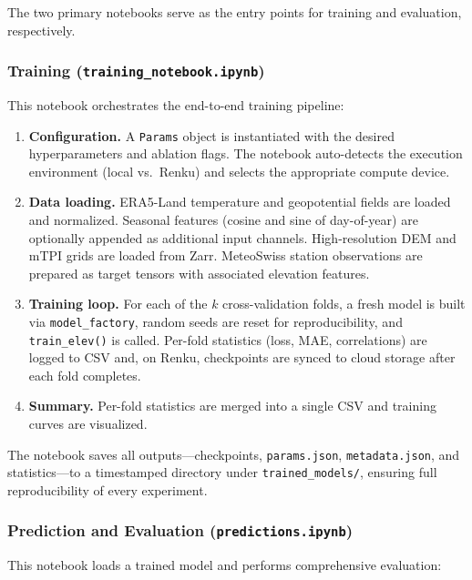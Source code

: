 The two primary notebooks serve as the entry points for training and evaluation, respectively.

\subsubsection{Training (\texttt{training\_notebook.ipynb})}

This notebook orchestrates the end-to-end training pipeline:

\begin{enumerate}
  \item \textbf{Configuration.} A \texttt{Params} object is instantiated with the desired hyperparameters and ablation flags.
  The notebook auto-detects the execution environment (local vs.\ Renku) and selects the appropriate compute device.

  \item \textbf{Data loading.} ERA5-Land temperature and geopotential fields are loaded and normalized.
  Seasonal features (cosine and sine of day-of-year) are optionally appended as additional input channels.
  High-resolution DEM and mTPI grids are loaded from Zarr.
  MeteoSwiss station observations are prepared as target tensors with associated elevation features.

  \item \textbf{Training loop.} For each of the $k$ cross-validation folds, a fresh model is built via \texttt{model\_factory}, random seeds are reset for reproducibility, and \texttt{train\_elev()} is called.
  Per-fold statistics (loss, MAE, correlations) are logged to CSV and, on Renku, checkpoints are synced to cloud storage after each fold completes.

  \item \textbf{Summary.} Per-fold statistics are merged into a single CSV and training curves are visualized.
\end{enumerate}

The notebook saves all outputs---checkpoints, \texttt{params.json}, \texttt{metadata.json}, and statistics---to a timestamped directory under \texttt{trained\_models/}, ensuring full reproducibility of every experiment.

\subsubsection{Prediction and Evaluation (\texttt{predictions.ipynb})}

This notebook loads a trained model and performs comprehensive evaluation:

